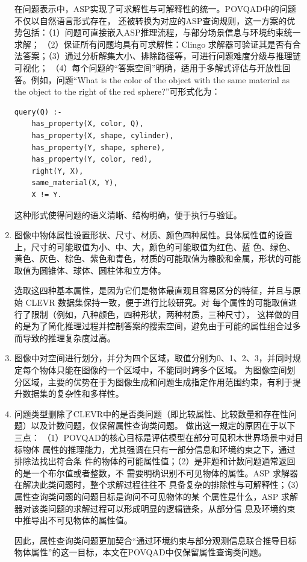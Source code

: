 \begin{enumerate}[nosep]
在问题表示中，ASP实现了可求解性与可解释性的统一。POVQAD中的问题不仅以自然语言形式存在，
还被转换为对应的ASP查询规则，这一方案的优势包括：（1）问题可直接嵌入ASP推理流程，与部分场景信息与环境约束统一求解；
（2）保证所有问题均具有可求解性：Clingo 求解器可验证其是否有合法答案；（3）通过分析解集大小、排除路径等，可进行问题难度分级与推理链可视化；
（4）每个问题的“答案空间”明确，适用于多解式评估与开放性回答。例如，问题“What is the color of the object with the same material as the object to the right of the red sphere?”可形式化为：
\begin{lstlisting}
query(Q) :-
    has_property(X, color, Q),
    has_property(X, shape, cylinder),
    has_property(Y, shape, sphere),
    has_property(Y, color, red),
    right(Y, X),
    same_material(X, Y),
    X != Y.
\end{lstlisting}
这种形式使得问题的语义清晰、结构明确，便于执行与验证。
\item 图像中物体属性设置形状、尺寸、材质、颜色四种属性。具体属性值的设置上，尺寸的可能取值为小、中、大，颜色的可能取值为红色、蓝
色、绿色、黄色、灰色、棕色、紫色和青色，材质的可能取值为橡胶和金属，形状的可能取值为圆锥体、球体、圆柱体和立方体。

选取这四种基本属性，是因为它们是物体最直观且容易区分的特征，并且与原始 CLEVR 数据集保持一致，便于进行比较研究。对
每个属性的可能取值进行了限制（例如，八种颜色，四种形状，两种材质，三种尺寸），
这样做的目的是为了简化推理过程并控制答案的搜索空间，避免由于可能的属性组合过多而导致的推理复杂度过高。
\item 图像中对空间进行划分，并分为四个区域，取值分别为0、1、2、3，并同时规定每个物体只能在图像的一个区域中，不能同时跨多个区域。
为图像空间划分区域，主要的优势在于为图像生成和问题生成指定作用范围约束，有利于提升数据集的复杂性和多样性。
\item 问题类型删除了CLEVR中的是否类问题（即比较属性、比较数量和存在性问题）以及计数问题，仅保留属性查询类问题。
做出这一规定的原因在于以下三点：
（1）POVQAD的核心目标是评估模型在部分可见积木世界场景中对目标物体
属性的推理能力，尤其强调在只有一部分信息和环境约束之下，通过排除法找出符合条
件的物体的可能属性值；（2）是非题和计数问题通常返回的是一个布尔值或者整数，不
需要明确识别不可见物体的属性。ASP 求解器在解决此类问题时，整个求解过程往往不
具备复杂的排除性与可解释性；（3）属性查询类问题的问题目标是询问不可见物体的某
个属性是什么，ASP 求解器对该类问题的求解过程可以形成明显的逻辑链条，从部分信
息及环境约束中推导出不可见物体的属性值。

因此，属性查询类问题更加契合“通过环境约束与部分观测信息联合推导目标物体属性”的这一目标，本文在POVQAD中仅保留属性查询类问题。
\end{enumerate}
